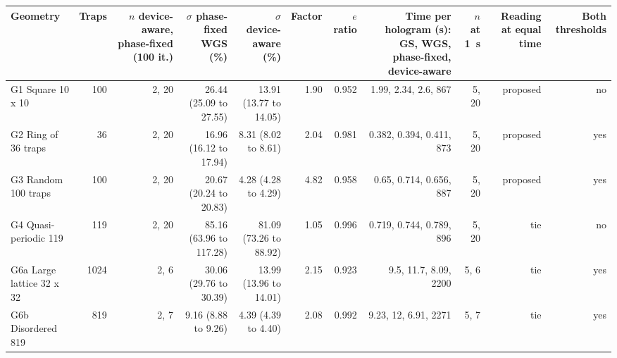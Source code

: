 \begin{tabular}{@{}l r r r r r r r r r r@{}}
\toprule
Geometry & Traps & $n$ device-aware, phase-fixed (100 it.) & $\sigma$ phase-fixed WGS (\%) & $\sigma$ device-aware (\%) & Factor & $e$ ratio & Time per hologram (s): GS, WGS, phase-fixed, device-aware & $n$ at 1~s & Reading at equal time & Both thresholds \\
\midrule
G1 Square 10 x 10 & 100 & 2, 20 & 26.44 (25.09 to 27.55) & 13.91 (13.77 to 14.05) & 1.90 & 0.952 & 1.99, 2.34, 2.6, 867 & 5, 20 & proposed & no \\
G2 Ring of 36 traps & 36 & 2, 20 & 16.96 (16.12 to 17.94) & 8.31 (8.02 to 8.61) & 2.04 & 0.981 & 0.382, 0.394, 0.411, 873 & 5, 20 & proposed & yes \\
G3 Random 100 traps & 100 & 2, 20 & 20.67 (20.24 to 20.83) & 4.28 (4.28 to 4.29) & 4.82 & 0.958 & 0.65, 0.714, 0.656, 887 & 5, 20 & proposed & yes \\
G4 Quasi-periodic 119 & 119 & 2, 20 & 85.16 (63.96 to 117.28) & 81.09 (73.26 to 88.92) & 1.05 & 0.996 & 0.719, 0.744, 0.789, 896 & 5, 20 & tie & no \\
G6a Large lattice 32 x 32 & 1024 & 2, 6 & 30.06 (29.76 to 30.39) & 13.99 (13.96 to 14.01) & 2.15 & 0.923 & 9.5, 11.7, 8.09, 2200 & 5, 6 & tie & yes \\
G6b Disordered 819 & 819 & 2, 7 & 9.16 (8.88 to 9.26) & 4.39 (4.39 to 4.40) & 2.08 & 0.992 & 9.23, 12, 6.91, 2271 & 5, 7 & tie & yes \\
\bottomrule
\end{tabular}

